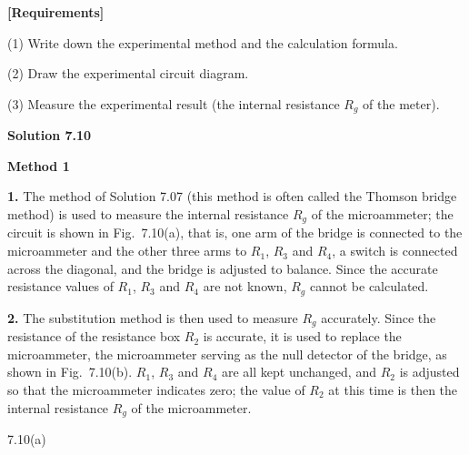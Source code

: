 \textbf{[Requirements]}

(1) Write down the experimental method and the calculation formula.

(2) Draw the experimental circuit diagram.

(3) Measure the experimental result (the internal resistance $R_g$ of the meter).

\textbf{Solution 7.10}

\textbf{Method 1}

\textbf{1.} The method of Solution 7.07 (this method is often called the Thomson bridge method) is used to measure the internal resistance $R_g$ of the microammeter; the circuit is shown in Fig.~7.10(a), that is, one arm of the bridge is connected to the microammeter and the other three arms to $R_1$, $R_3$ and $R_4$, a switch is connected across the diagonal, and the bridge is adjusted to balance. Since the accurate resistance values of $R_1$, $R_3$ and $R_4$ are not known, $R_g$ cannot be calculated.

\textbf{2.} The substitution method is then used to measure $R_g$ accurately. Since the resistance of the resistance box $R_2$ is accurate, it is used to replace the microammeter, the microammeter serving as the null detector of the bridge, as shown in Fig.~7.10(b). $R_1$, $R_3$ and $R_4$ are all kept unchanged, and $R_2$ is adjusted so that the microammeter indicates zero; the value of $R_2$ at this time is then the internal resistance $R_g$ of the microammeter.

\begin{figbox}{7.10(a)}
\end{figbox}

